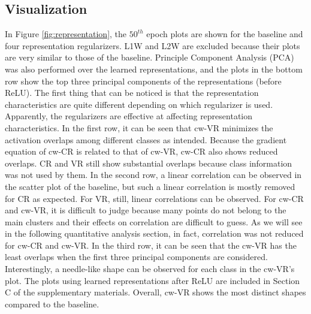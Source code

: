 \subsection{Visualization}
In Figure \ref{fig:representation}, the $50^{th}$ epoch plots are shown for the baseline and four representation regularizers. L1W and L2W are excluded because their plots are very similar to those of the baseline.
Principle Component Analysis (PCA) was also performed over the learned representations, and the plots in the bottom row show the top three principal components of the representations (before ReLU).
The first thing that can be noticed is that the representation characteristics are quite different depending on which regularizer is used. Apparently, the regularizers are effective at affecting representation characteristics. 
In the first row, it can be seen that cw-VR minimizes the activation overlaps among different classes as intended. Because the gradient equation of cw-CR is related to that of cw-VR, cw-CR also shows reduced overlaps. CR and VR still show substantial overlaps because class information was not used by them. 
In the second row, a linear correlation can be observed in the scatter plot of the baseline, but such a linear correlation is mostly removed for CR as expected. For VR, still, linear correlations can be observed. For cw-CR and cw-VR, it is difficult to judge because many points do not belong to the main clusters and their effects on correlation are difficult to guess. As we will see in the following quantitative analysis section, in fact, correlation was not reduced for cw-CR and cw-VR.
In the third row, it can be seen that the cw-VR has the least overlaps when the first three principal components are considered. Interestingly, a needle-like shape can be observed for each class in the cw-VR's plot. The plots using learned representations after ReLU are included in Section C of the supplementary materials. Overall, cw-VR shows the most distinct shapes compared to the baseline. 

